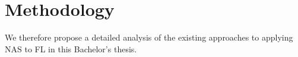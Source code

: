 

\section{Methodology}

We therefore propose a detailed analysis of the existing approaches to applying NAS to FL in this Bachelor's thesis.


